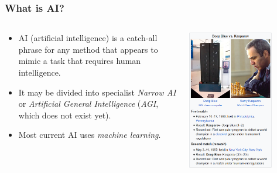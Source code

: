 \begin{frame}
\frametitle{What is AI?}


\begin{columns}[T]
    \begin{column}[T]{0.44\textwidth}
    \begin{itemize}
    \setlength{\itemsep}{2mm}
        \item AI (artificial intelligence) is a catch-all phrase for any method that appears to mimic a task that requires human intelligence.
        \item It may be divided into specialist \textit{Narrow AI} or \textit{Artificial General Intelligence} (\textit{AGI}, which does not exist yet).
        \item Most current AI uses \textit{machine learning}.
    \end{itemize}
           
    \end{column}


    \begin{column}[T]{0.55\textwidth}
    \vspace{-3mm}
        \begin{center}
            \includegraphics[width=0.75\textwidth]{./misc_images/deep_blue}
        
    \end{center}

    \end{column}
\end{columns}

\end{frame}